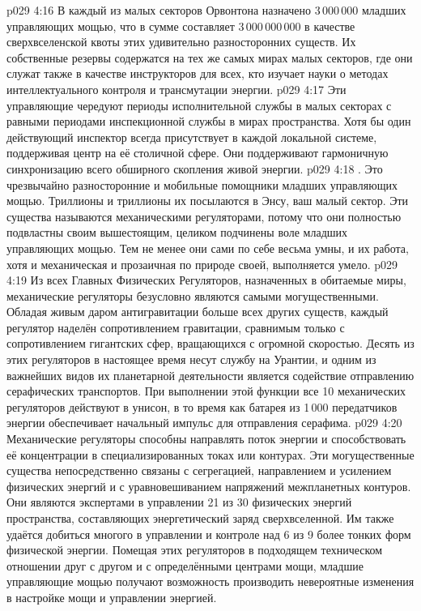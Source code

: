 \vs p029 4:16 В каждый из малых секторов Орвонтона назначено 3\,000\,000 младших управляющих мощью, что в сумме составляет 3\,000\,000\,000 в качестве сверхвселенской квоты этих удивительно разносторонних существ. Их собственные резервы содержатся на тех же самых мирах малых секторов, где они служат также в качестве инструкторов для всех, кто изучает науки о методах интеллектуального контроля и трансмутации энергии.
\vs p029 4:17 Эти управляющие чередуют периоды исполнительной службы в малых секторах с равными периодами инспекционной службы в мирах пространства. Хотя бы один действующий инспектор всегда присутствует в каждой локальной системе, поддерживая центр на её столичной сфере. Они поддерживают гармоничную синхронизацию всего обширного скопления живой энергии.
\vs p029 4:18 . Это чрезвычайно разносторонние и мобильные помощники младших управляющих мощью. Триллионы и триллионы их посылаются в Энсу, ваш малый сектор. Эти существа называются механическими регуляторами, потому что они полностью подвластны своим вышестоящим, целиком подчинены воле младших управляющих мощью. Тем не менее они сами по себе весьма умны, и их работа, хотя и механическая и прозаичная по природе своей, выполняется умело.
\vs p029 4:19 Из всех Главных Физических Регуляторов, назначенных в обитаемые миры, механические регуляторы безусловно являются самыми могущественными. Обладая живым даром антигравитации больше всех других существ, каждый регулятор наделён сопротивлением гравитации, сравнимым только с сопротивлением гигантских сфер, вращающихся с огромной скоростью. Десять из этих регуляторов в настоящее время несут службу на Урантии, и одним из важнейших видов их планетарной деятельности является содействие отправлению серафических транспортов. При выполнении этой функции все 10 механических регуляторов действуют в унисон, в то время как батарея из 1\,000 передатчиков энергии обеспечивает начальный импульс для отправления серафима.
\vs p029 4:20 Механические регуляторы способны направлять поток энергии и способствовать её концентрации в специализированных токах или контурах. Эти могущественные существа непосредственно связаны с сегрегацией, направлением и усилением физических энергий и с уравновешиванием напряжений межпланетных контуров. Они являются экспертами в управлении 21 из 30 физических энергий пространства, составляющих энергетический заряд сверхвселенной. Им также удаётся добиться многого в управлении и контроле над 6 из 9 более тонких форм физической энергии. Помещая этих регуляторов в подходящем техническом отношении друг с другом и с определёнными центрами мощи, младшие управляющие мощью получают возможность производить невероятные изменения в настройке мощи и управлении энергией.
